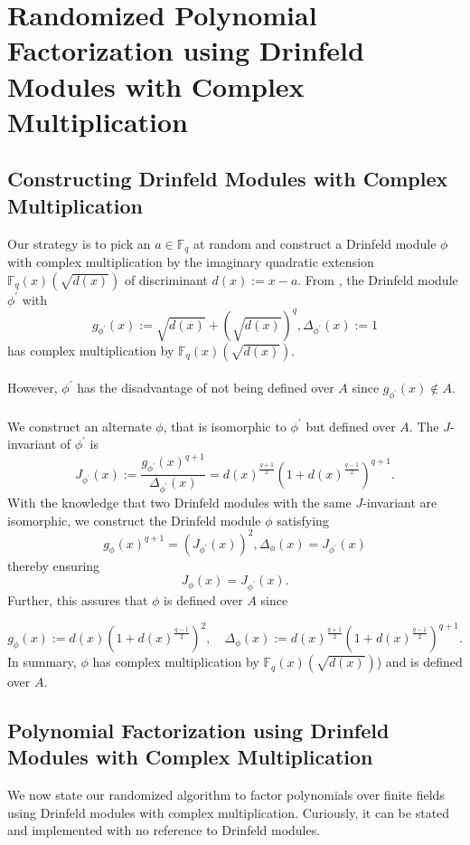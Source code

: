 \documentclass[12pt]{article}
\theoremstyle{plain}
\theoremstyle{definition}
\def\F{\ensuremath{\mathbb{F}}}
\newcommand{\D}{\Delta}
\begin{document}
\section{Randomized Polynomial Factorization using Drinfeld Modules with Complex Multiplication}
\subsection{Constructing Drinfeld Modules with Complex 
Multiplication}\label{drinfeld_construction_subsection}

Our strategy is to pick an $a \in \F_q$ at random and construct a Drinfeld module $\phi$ with complex multiplication by the imaginary quadratic extension $\F_q(x)(\sqrt{d(x)})$ of discriminant $d(x):=x-a$. From \cite{dor}, the Drinfeld module $\phi^\prime$ with $$g_{\phi^\prime}(x):=\sqrt{d(x)}+\left(\sqrt{d(x)}\right)^q, \D_{\phi^\prime}(x) := 1$$ has complex multiplication by $\F_q(x)(\sqrt{d(x)})$.\\ \\
However, $\phi^\prime$ has the disadvantage of not being defined over $A$ since $g_{\phi^\prime}(x) \notin A$.\\ \\
We construct an alternate $\phi$, that is isomorphic to $\phi^\prime$ but defined over $A$. The $J$-invariant \cite{gek} of $\phi^\prime$ is $$J_{\phi^\prime}(x) := \frac{g_{\phi^\prime}(x)^{q+1}}{\D_{\phi^\prime}(x)} = d(x)^{\frac{q+1}{2}}\left(1+d(x)^{\frac{q-1}{2}}\right)^{q+1}.$$
With the knowledge that two Drinfeld modules with the same $J$-invariant are isomorphic, we construct the Drinfeld module $\phi$ satisfying $$g_\phi(x)^{q+1} = (J_{\phi^\prime}(x))^2, \D_{\phi}(x)= J_{\phi^\prime}(x)$$ thereby ensuring $$J_{\phi}(x)=J_{\phi^\prime}(x).$$ Further, this assures that $\phi$ is defined over $A$ since

$$g_\phi(x):=d(x)(1+d(x)^{\frac{q-1}{2}})^2, \quad 
\D_\phi(x):=d(x)^{\frac{q+1}{2}}(1+d(x)^{\frac{q-1}{2}})^{q+1}.$$
In summary, $\phi$ has complex multiplication by $\F_q(x)(\sqrt{d(x)})$) and is defined over $A$.
\subsection{Polynomial Factorization using Drinfeld Modules with Complex Multiplication}
We now state our randomized algorithm to factor polynomials over finite fields using Drinfeld modules with complex multiplication. Curiously, it can be stated and implemented with no reference to Drinfeld modules.
\end{document}
